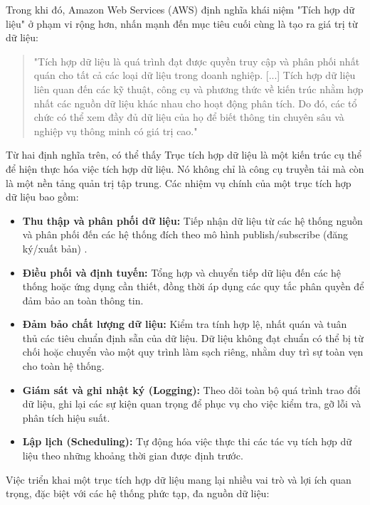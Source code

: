 Trong khi đó, Amazon Web Services (AWS) định nghĩa khái niệm "Tích hợp dữ liệu" ở phạm vi rộng hơn, nhấn mạnh đến mục tiêu cuối cùng là tạo ra giá trị từ dữ liệu:
\begin{quote}
"Tích hợp dữ liệu là quá trình đạt được quyền truy cập và phân phối nhất quán cho tất cả các loại dữ liệu trong doanh nghiệp. [...] Tích hợp dữ liệu liên quan đến các kỹ thuật, công cụ và phương thức về kiến trúc nhằm hợp nhất các nguồn dữ liệu khác nhau cho hoạt động phân tích. Do đó, các tổ chức có thể xem đầy đủ dữ liệu của họ để biết thông tin chuyên sâu và nghiệp vụ thông minh có giá trị cao." \cite{aws:whatisdi}
\end{quote}

Từ hai định nghĩa trên, có thể thấy Trục tích hợp dữ liệu là một kiến trúc cụ thể để hiện thực hóa việc tích hợp dữ liệu. Nó không chỉ là công cụ truyền tải mà còn là một nền tảng quản trị tập trung. Các nhiệm vụ chính của một trục tích hợp dữ liệu bao gồm:

\begin{itemize}
    \item \textbf{Thu thập và phân phối dữ liệu:} Tiếp nhận dữ liệu từ các hệ thống nguồn và phân phối đến các hệ thống đích theo mô hình publish/subscribe (đăng ký/xuất bản) \cite{microsoft:pubsub, confluent:pubsub}.
    \item \textbf{Điều phối và định tuyến:} Tổng hợp và chuyển tiếp dữ liệu đến các hệ thống hoặc ứng dụng cần thiết, đồng thời áp dụng các quy tắc phân quyền để đảm bảo an toàn thông tin.
    \item \textbf{Đảm bảo chất lượng dữ liệu:} Kiểm tra tính hợp lệ, nhất quán và tuân thủ các tiêu chuẩn định sẵn của dữ liệu. Dữ liệu không đạt chuẩn có thể bị từ chối hoặc chuyển vào một quy trình làm sạch riêng, nhằm duy trì sự toàn vẹn cho toàn hệ thống.
    \item \textbf{Giám sát và ghi nhật ký (Logging):} Theo dõi toàn bộ quá trình trao đổi dữ liệu, ghi lại các sự kiện quan trọng để phục vụ cho việc kiểm tra, gỡ lỗi và phân tích hiệu suất.
    \item \textbf{Lập lịch (Scheduling):} Tự động hóa việc thực thi các tác vụ tích hợp dữ liệu theo những khoảng thời gian được định trước.
\end{itemize}

Việc triển khai một trục tích hợp dữ liệu mang lại nhiều vai trò và lợi ích quan trọng, đặc biệt với các hệ thống phức tạp, đa nguồn dữ liệu:

